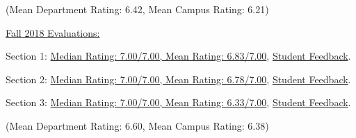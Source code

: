 \documentclass[letterpaper,10pt]{article}
\begin{document}
{\begin{description}
				\item (Mean Department Rating: 6.42, Mean Campus Rating: 6.21)
				\item \underline{Fall 2018 Evaluations:}
				\item Section 1: \href{https://nrjenkins.github.io/nrjenkins.github.io/files/docs/teaching_evals/POSC010_Fall20_Section24_Scores.pdf}{Median Rating: 7.00/7.00, Mean Rating: 6.83/7.00}, \href{https://nrjenkins.github.io/nrjenkins.github.io/files/docs/teaching_evals/POSC010_Fall20_Section24_Comments.pdf}{Student Feedback}.
				\item Section 2: \href{https://nrjenkins.github.io/nrjenkins.github.io/files/docs/teaching_evals/POSC010_Fall20_Section26_Scores.pdf}{Median Rating: 7.00/7.00, Mean Rating: 6.78/7.00}, \href{https://nrjenkins.github.io/nrjenkins.github.io/files/docs/teaching_evals/POSC010_Fall20_Section26_Comments.pdf}{Student Feedback}.
				\item Section 3: \href{https://nrjenkins.github.io/nrjenkins.github.io/files/docs/teaching_evals/POSC010_Fall20_Section32_Scores.pdf}{Median Rating: 7.00/7.00, Mean Rating: 6.33/7.00}, \href{https://nrjenkins.github.io/nrjenkins.github.io/files/docs/teaching_evals/POSC010_Fall20_Section32_Comments.pdf}{Student Feedback}.
				\item (Mean Department Rating: 6.60, Mean Campus Rating: 6.38)
			\end{description}}
\end{document}
